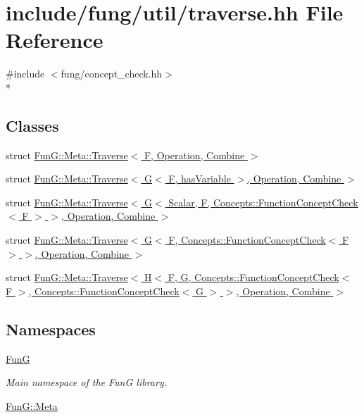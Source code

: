 \hypertarget{traverse_8hh}{\section{include/fung/util/traverse.hh File Reference}
\label{traverse_8hh}
}
{\ttfamily \#include $<$fung/concept\-\_\-check.\-hh$>$}\\*
\subsection*{Classes}
\begin{DoxyCompactItemize}
\item 
struct \hyperlink{structFunG_1_1Meta_1_1Traverse}{Fun\-G\-::\-Meta\-::\-Traverse$<$ F, Operation, Combine $>$}
\item 
struct \hyperlink{structFunG_1_1Meta_1_1Traverse_3_01G_3_01F_00_01hasVariable_01_4_00_01Operation_00_01Combine_01_4}{Fun\-G\-::\-Meta\-::\-Traverse$<$ G$<$ F, has\-Variable $>$, Operation, Combine $>$}
\item 
struct \hyperlink{structFunG_1_1Meta_1_1Traverse_3_01G_3_01Scalar_00_01F_00_01Concepts_1_1FunctionConceptCheck_3_056d96032cb56cdcfc81b282c6fc44c83}{Fun\-G\-::\-Meta\-::\-Traverse$<$ G$<$ Scalar, F, Concepts\-::\-Function\-Concept\-Check$<$ F $>$ $>$, Operation, Combine $>$}
\item 
struct \hyperlink{structFunG_1_1Meta_1_1Traverse_3_01G_3_01F_00_01Concepts_1_1FunctionConceptCheck_3_01F_01_4_01_473eb79b17eeedd14b27190d68eb8ea5c}{Fun\-G\-::\-Meta\-::\-Traverse$<$ G$<$ F, Concepts\-::\-Function\-Concept\-Check$<$ F $>$ $>$, Operation, Combine $>$}
\item 
struct \hyperlink{structFunG_1_1Meta_1_1Traverse_3_01H_3_01F_00_01G_00_01Concepts_1_1FunctionConceptCheck_3_01F_013370ce68fd07becd92320937a020c699}{Fun\-G\-::\-Meta\-::\-Traverse$<$ H$<$ F, G, Concepts\-::\-Function\-Concept\-Check$<$ F $>$, Concepts\-::\-Function\-Concept\-Check$<$ G $>$ $>$, Operation, Combine $>$}
\end{DoxyCompactItemize}
\subsection*{Namespaces}
\begin{DoxyCompactItemize}
\item 
\hyperlink{namespaceFunG}{Fun\-G}
\begin{DoxyCompactList}\small\item\em Main namespace of the Fun\-G library. \end{DoxyCompactList}\item 
\hyperlink{namespaceFunG_1_1Meta}{Fun\-G\-::\-Meta}
\end{DoxyCompactItemize}
